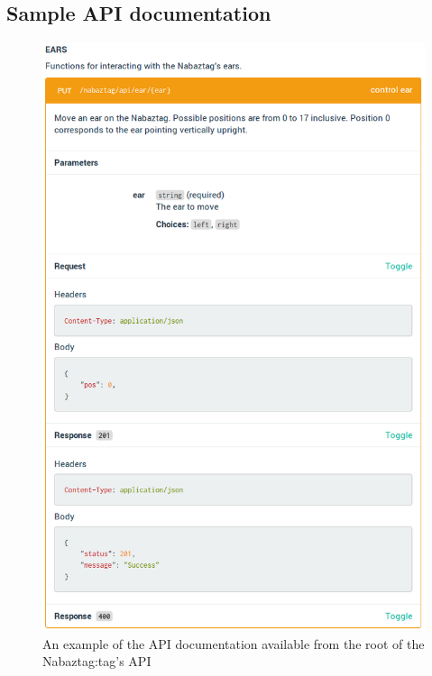 \documentclass[12pt, a4paper]{article}
\begin{document}
\begin{appendices}
\newpage	
	
\section{Sample \acs{API} documentation}\label{app:apidoc}
	\begin{figure}[H] 
		\centerline{\includegraphics[scale=0.55]{images/apidoc.png}}
		\caption[Example of documentation page for Nabaztag:tag \acs{REST} \acs{API}]{An example of the \ac{API} documentation available from the root of the Nabaztag:tag's \ac{API}}
		\label{fig:apidoc}
	\end{figure}

\newpage
	

\end{appendices}
\end{document}
